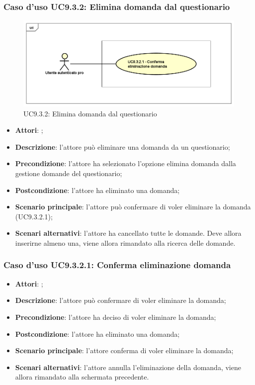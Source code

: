 		 \subsubsection{Caso d'uso UC9.3.2: Elimina domanda dal questionario}
		 \label{UC9.3.2}
		 \begin{figure}[h]
		 	\centering
		 	\includegraphics[scale=0.5,keepaspectratio]{UML/UC9_3_2.png}
		 	\caption{UC9.3.2: Elimina domanda dal questionario}
		 \end{figure}
		 \FloatBarrier
		 \begin{itemize}
		 	\item \textbf{Attori}: \uaupro{};
		 	\item \textbf{Descrizione}: l'attore può eliminare una domanda da un questionario;
		 	\item \textbf{Precondizione}: l'attore ha selezionato l'opzione elimina domanda dalla gestione domande del questionario;
		 	\item \textbf{Postcondizione}: l'attore ha eliminato una domanda;
		 	\item \textbf{Scenario principale}: l'attore può confermare di voler eliminare la domanda (UC9.3.2.1); 
		 	\item \textbf{Scenari alternativi}: l'attore ha cancellato tutte le domande. Deve allora inserirne almeno una, viene allora rimandato alla ricerca delle domande.
		 \end{itemize}
		 
		 \subsubsection{Caso d'uso UC9.3.2.1: Conferma eliminazione domanda}
		 \label{UC9.3.2.1}
		 \begin{itemize}
		 	\item \textbf{Attori}: \uaupro{};
		 	\item \textbf{Descrizione}: l'attore può confermare di voler eliminare la domanda;
		 	\item \textbf{Precondizione}: l'attore ha deciso di voler eliminare la domanda;
		 	\item \textbf{Postcondizione}: l'attore ha eliminato una domanda;
		 	\item \textbf{Scenario principale}: l'attore conferma di voler eliminare la domanda;
		 	\item \textbf{Scenari alternativi}: l'attore annulla l'eliminazione della domanda, viene allora rimandato alla schermata precedente.
		 \end{itemize}
		 
